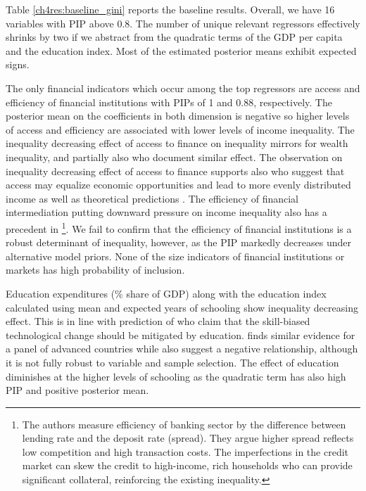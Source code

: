 \documentclass[preprint, nonatbib, 10pt]{elsarticle}
\begin{document}

Table \ref{ch4res:baseline_gini} reports the baseline results. Overall, we have 16 variables with \ac{PIP} above 0.8. The number of unique relevant regressors effectively shrinks by two if we abstract from the quadratic terms of the \ac{GDP} per capita and the education index. Most of the estimated posterior means exhibit expected signs.

The only financial indicators which occur among the top regressors are access and efficiency of financial institutions with \acp{PIP} of 1 and 0.88, respectively. The posterior mean on the coefficients in both dimension is negative so higher levels of access and efficiency are associated with lower levels of income inequality. The inequality decreasing effect of access to finance on inequality mirrors \textcite{hasan2020finance} for wealth inequality, and partially also \textcite{furceri2019robust, naceurzhang2016} who document similar effect. The observation on inequality decreasing effect of access to finance supports also \textcite{claessens2007finance} who suggest that access may equalize economic opportunities and lead to more evenly distributed income as well as theoretical predictions \parencite{braunetal2019,galormoav2004,banerjeenewman1990}. The efficiency of financial intermediation putting downward pressure on income inequality also has a precedent in \textcite{gimet2011closer}\footnote{The authors measure efficiency of banking sector by the difference between lending rate and the deposit rate (spread). They argue higher spread reflects low competition and high transaction costs. The imperfections in the credit market can skew the credit to high-income, rich households who can provide significant collateral, reinforcing the existing inequality.}. We fail to confirm that the efficiency of financial institutions is a robust determinant of inequality, however, as the \ac{PIP} markedly decreases under alternative model priors. None of the size indicators of financial institutions or markets has high probability of inclusion.

Education expenditures (\% share of \ac{GDP}) along with the education index calculated using mean and expected years of schooling show inequality decreasing effect. This is in line with prediction of \textcite{goldin2009race,deaton2013great} who claim that the skill-biased technological change should be mitigated by education. \textcite{oecd2011divided} finds similar evidence for a panel of advanced countries while \textcite{furceri2019robust} also suggest a negative relationship, although it is not fully robust to variable and sample selection. The effect of education diminishes at the higher levels of schooling as the quadratic term has also high \ac{PIP} and positive posterior mean. 
\end{document}
